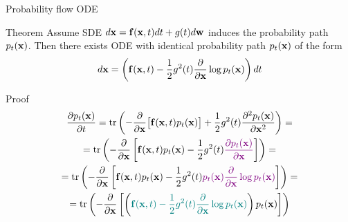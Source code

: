 \begin{frame}{Probability flow ODE}
	\begin{block}{Theorem}
		Assume SDE $d\mathbf{x} = \mathbf{f}(\mathbf{x}, t) dt + g(t) d \mathbf{w}$ induces the probability path~$p_t(\mathbf{x})$.
		Then there exists ODE with identical probability path $p_t(\mathbf{x})$ of the form
		\vspace{-0.3cm}
		\[
			d\mathbf{x} = \left(\mathbf{f}(\mathbf{x}, t) -\frac{1}{2} g^2(t) \frac{\partial}{\partial \mathbf{x}} \log p_t(\mathbf{x}) \right) dt
		\]
		\vspace{-0.7cm}
	\end{block}
	\begin{block}{Proof}
 		\vspace{-0.7cm}
 		{\small
 		\begin{multline*}
 			\frac{\partial p_t(\mathbf{x})}{\partial t} = \text{tr}\left(- \frac{\partial}{\partial \mathbf{x}} \bigl[ \mathbf{f}(\mathbf{x}, t) p_t(\mathbf{x})\bigr] + \frac{1}{2} g^2(t) \frac{\partial^2 p_t(\mathbf{x})}{\partial \mathbf{x}^2} \right) = \\
 			=  \text{tr}\left(- \frac{\partial}{\partial \mathbf{x}} \left[ \mathbf{f}(\mathbf{x}, t) p_t(\mathbf{x}) - \frac{1}{2} g^2(t) {\color{violet}\frac{\partial p_t(\mathbf{x})}{\partial \mathbf{x}}} \right]  \right) = \\
			 =  \text{tr}\left(- \frac{\partial}{\partial \mathbf{x}} \left[ \mathbf{f}(\mathbf{x}, t) p_t(\mathbf{x}) - \frac{1}{2} g^2(t) {\color{violet}p_t(\mathbf{x}) \frac{\partial}{\partial \mathbf{x}} \log p_t(\mathbf{x})} \right]  \right)= \\
		  =  \text{tr}\left(- \frac{\partial}{\partial \mathbf{x}} \left[ \left( {\color{teal}\mathbf{f}(\mathbf{x}, t) - \frac{1}{2} g^2(t) \frac{\partial}{\partial \mathbf{x}} \log p_t(\mathbf{x})}\right) p_t(\mathbf{x}) \right]  \right)
 		\end{multline*}
 		}
 	\end{block}
\end{frame}
